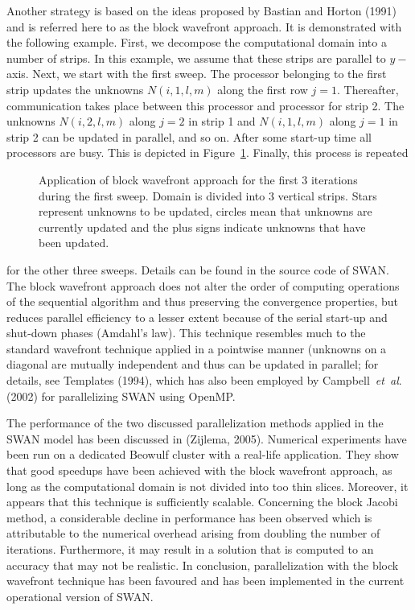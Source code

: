\documentclass[12pt]{book}
\begin{document}
Another strategy is based on the ideas proposed by Bastian and Horton (1991) and is
referred here to as the block wavefront approach. It is demonstrated with the following
example. First, we decompose the computational domain into a number of strips. In this
example, we assume that these strips are parallel to $y-$axis. Next, we start with the
first sweep. The processor belonging to the first strip updates the unknowns $N(i,1,l,m)$
along the first row $j=1$. Thereafter, communication takes place between this processor and
processor for strip 2. The unknowns $N(i,2,l,m)$ along $j=2$ in strip 1 and $N(i,1,l,m)$ along
$j=1$ in strip 2 can be updated in parallel, and so on. After some start-up time all processors
are busy. This is depicted in Figure~\ref{fig:wfront}. Finally, this process is repeated
\begin{figure}[htb]
   \centerline{
              }
      \caption{Application of block wavefront approach for the first 3 iterations during the
               first sweep. Domain is divided into 3 vertical strips. Stars represent unknowns
               to be updated, circles mean that unknowns are currently updated and the plus
               signs indicate unknowns that have been updated.}
      \label{fig:wfront}
\end{figure}
for the other three sweeps. Details can be found in the source code of SWAN. The block
wavefront approach does not alter the order of computing operations of the sequential algorithm
and thus preserving the convergence properties, but reduces parallel efficiency to a lesser
extent because of the serial start-up and shut-down phases (Amdahl's law). This technique
resembles much to the standard wavefront technique applied in a pointwise manner (unknowns on
a diagonal are mutually independent and thus can be updated in parallel; for details, see
Templates (1994), which has also been employed by Campbell~{\it et~al}. (2002) for
parallelizing SWAN using OpenMP.
\nocite{Templates94,Cam02R}

The performance of the two discussed parallelization methods applied in the SWAN model has been
discussed in (Zijlema, 2005).
Numerical experiments have been run on a dedicated Beowulf cluster with a real-life application.
They show that good speedups have been achieved with the
block wavefront approach, as long as the computational domain is not divided into too thin slices. Moreover,
it appears that this technique is sufficiently scalable. Concerning the block Jacobi method, a considerable
decline in performance has been observed which is attributable to the numerical overhead arising from doubling
the number of iterations. Furthermore, it may result in a solution that is computed to an accuracy that may not
be realistic. In conclusion, parallelization with the block wavefront technique has been favoured and has been
implemented in the current operational version of SWAN.
\end{document}
